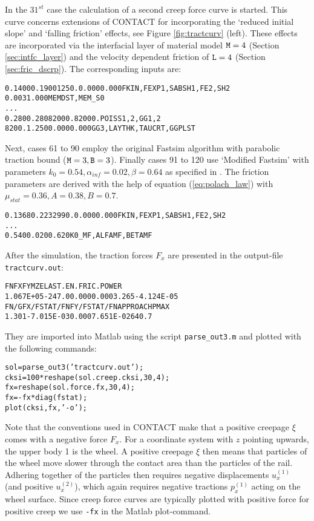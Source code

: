 \documentclass[12pt]{report}
\begin{document}
In the $31^{st}$ case the calculation of a second creep force curve is
started. This curve concerns extensions of CONTACT for incorporating the
`reduced initial slope' and `falling friction' effects, see Figure
\ref{fig:tractcurv} (left). These effects are incorporated via the
interfacial layer of material model ${\tt M}=4$ (Section
\ref{sec:intfc_layer}) and the velocity dependent friction of ${\tt L}=4$
(Section \ref{sec:fric_dscrp}). The corresponding inputs are:
\begin{alltt}\small
% Exponential falling friction (L=4):
   0.1400     0.1900     1250.    0.000   0.000  FKIN, FEXP1,SABSH1,FE2,SH2
   0.003      1.000                              MEMDST, MEM_S0
...
% Elastic bodies with elasto-plastic interface layer (M=4):
   0.280      0.280      82000.   82000.         POISS 1,2,  GG 1,2
   8200.      1.250      0.000    0.000          GG3, LAYTHK, TAUCRT, GGPLST
\end{alltt}
Next, cases 61 to 90 employ the original Fastsim algorithm with parabolic
traction bound (${\tt M}=3, {\tt B}=3$). Finally cases 91 to 120 use
`Modified Fastsim' with parameters $k_0=0.54, \alpha_{inf}=0.02,
\beta=0.64$ as specified in \cite{Spiryagin2013}. The friction
parameters are derived with the help of equation (\ref{eq:polach_law})
with $\mu_{stat}=0.36, A=0.38, B=0.7$.
\begin{alltt}\small
% Exponential falling friction (L=4), static 0.36(!):
   0.1368     0.2232      990.   0.000   0.000   FKIN, FEXP1,SABSH1,FE2,SH2
...
% Slope reduction for Modified Fastsim algorithm (M=3):
   0.540      0.020      0.620                   K0\_MF,ALFAMF,BETAMF
\end{alltt}

After the simulation, the traction forces $F_x$ are presented in
the output-file {\tt tractcurv.out}:
\begin{alltt}\small
     FN          FX          FY          MZ         ELAST.EN.   FRIC.POWER
     1.067E+05      -247.0       0.000       0.000       3.265  -4.124E-05
     FN/G      FX/FSTAT/FN  FY/FSTAT/FN  APPROACH     PMAX    
         1.301  -7.015E-03       0.000   7.651E-02       640.7
\end{alltt}
They are imported into Matlab using the script {\tt parse\_out3.m} and
plotted with the following commands:
\begin{alltt}\small
   sol  = parse_out3('tractcurv.out');
   cksi = 100 * reshape(sol.creep.cksi, 30, 4);
   fx   =       reshape(sol.force.fx, 30, 4);
   fx   = -fx * diag(fstat);
   plot(cksi, fx, '-o');
\end{alltt}
Note that the conventions used in CONTACT make that a positive creepage
$\xi$ comes with a negative force $F_x$. For a coordinate system with $z$
pointing upwards, the upper body 1 is the wheel. A positive creepage $\xi$
then means that particles of the wheel move slower through the contact area
than the particles of the rail. Adhering together of the particles then
requires negative displacements $u^{(1)}_x$ (and positive $u^{(2)}_x$), which
again requires negative tractions $p^{(1)}_x$ acting on the wheel surface.
Since creep force curves are typically plotted with positive force for
positive creep we use {\tt -fx} in the Matlab plot-command.
\end{document}
